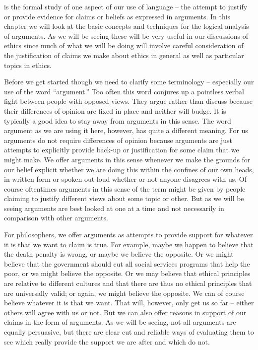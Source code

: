 \documentclass[justified]{tufte-book}
\begin{document}
 is the formal study of one aspect of our use of language -- the attempt to justify or provide evidence for claims or beliefs as expressed in arguments. In this chapter we will look at the basic concepts and techniques for the logical analysis of arguments. As we will be seeing these will be very useful in our discussions of ethics since much of what we will be doing will involve careful consideration of the justification of claims we make about ethics in general as well as particular topics in ethics.

Before we get started though we need to clarify some terminology -- especially our use of the word ``argument.'' Too often this word conjures up a pointless verbal fight between people with opposed views. They argue rather than discuss because their differences of opinion are fixed in place and neither will budge. It is typically a good idea to stay away from arguments in this sense. The word argument as we are using it here, however, has quite a different meaning. For us arguments do not require differences of opinion because arguments are just attempts to explicitly provide back-up or justification for some claim that we might make. We offer arguments in this sense whenever we make the grounds for our belief explicit whether we are doing this within the confines of our own heads, in written form or spoken out loud whether or not anyone disagrees with us. Of course oftentimes arguments in this sense of the term might be given by people claiming to justify different views about some topic or other. But as we will be seeing arguments are best looked at one at a time and not necessarily in comparison with other arguments.

For philosophers, we offer arguments as attempts to provide support for whatever it is that we want to claim is true. For example, maybe we happen to believe that the death penalty is wrong, or maybe we believe the opposite. Or we might believe that the government should cut all social services programs that help the poor, or we might believe the opposite. Or we may believe that ethical principles are relative to different cultures and that there are thus no ethical principles that are universally valid; or again, we might believe the opposite. We can of course believe whatever it is that we want. That will, however, only get us so far -- either others will agree with us or not. But we can also offer reasons in support of our claims in the form of arguments. As we will be seeing, not all arguments are equally persuasive, but there are clear cut and reliable ways of evaluating them to see which really provide the support we are after and which do not.
\end{document}
